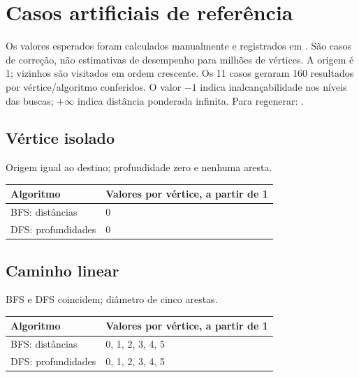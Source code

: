 \documentclass[a4paper,12pt]{article}
\newcommand{\cod}[1]{\texttt{\detokenize{#1}}}
\begin{document}
\section{Casos artificiais de referência}
Os valores esperados foram calculados manualmente e registrados em . São casos de correção, não estimativas de desempenho para milhões de vértices. A origem é 1; vizinhos são visitados em ordem crescente. Os 11 casos geraram 160 resultados por vértice/algoritmo conferidos. O valor $-1$ indica inalcançabilidade nos níveis das buscas; $+\infty$ indica distância ponderada infinita. Para regenerar: \cod{make baselines}.
\par\noindent\begin{minipage}{\textwidth}\subsection{Vértice isolado}
Origem igual ao destino; profundidade zero e nenhuma aresta.
\par\smallskip\noindent\begin{minipage}{\textwidth}\centering
\begingroup\small
\setlength{\tabcolsep}{4pt}
\begin{tabular}{l>{\raggedright\arraybackslash}p{10.4cm}}
\toprule
Algoritmo & Valores por vértice, a partir de 1 \\
\midrule
BFS: distâncias & \num{0} \\
DFS: profundidades & \num{0} \\
\bottomrule
\end{tabular}
\endgroup
\end{minipage}\par\smallskip
\end{minipage}\par\medskip
\par\noindent\begin{minipage}{\textwidth}\subsection{Caminho linear}
BFS e DFS coincidem; diâmetro de cinco arestas.
\par\smallskip\noindent\begin{minipage}{\textwidth}\centering
\begingroup\small
\setlength{\tabcolsep}{4pt}
\begin{tabular}{l>{\raggedright\arraybackslash}p{10.4cm}}
\toprule
Algoritmo & Valores por vértice, a partir de 1 \\
\midrule
BFS: distâncias & \num{0}, \num{1}, \num{2}, \num{3}, \num{4}, \num{5} \\
DFS: profundidades & \num{0}, \num{1}, \num{2}, \num{3}, \num{4}, \num{5} \\
\bottomrule
\end{tabular}
\endgroup
\end{minipage}\par\smallskip
\end{minipage}\par\medskip
\end{document}
